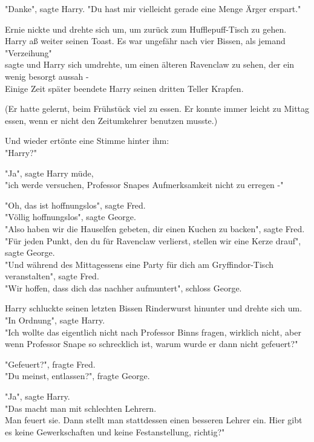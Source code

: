 {"Danke", sagte Harry. "Du hast mir vielleicht gerade eine Menge Ärger erspart."

Ernie nickte und drehte sich um, um zurück zum Hufflepuff-Tisch zu gehen.\\ Harry aß weiter seinen Toast. Es war ungefähr nach vier Bissen, als jemand\\ "Verzeihung"\\ sagte und Harry sich umdrehte, um einen älteren Ravenclaw zu sehen, der ein wenig besorgt aussah -\\ Einige Zeit später beendete Harry seinen dritten Teller Krapfen.

(Er hatte gelernt, beim Frühstück viel zu essen. Er konnte immer leicht zu Mittag essen, wenn er nicht den Zeitumkehrer benutzen musste.)

Und wieder ertönte eine Stimme hinter ihm:\\ "Harry?"

"Ja", sagte Harry müde,\\ "ich werde versuchen, Professor Snapes Aufmerksamkeit nicht zu erregen -"

"Oh, das ist hoffnungslos", sagte Fred.\\ "Völlig hoffnungslos", sagte George.\\ "Also haben wir die Hauselfen gebeten, dir einen Kuchen zu backen", sagte Fred.\\ "Für jeden Punkt, den du für Ravenclaw verlierst, stellen wir eine Kerze drauf", sagte George.\\ "Und während des Mittagessens eine Party für dich am Gryffindor-Tisch veranstalten", sagte Fred.\\ "Wir hoffen, dass dich das nachher aufmuntert", schloss George.

Harry schluckte seinen letzten Bissen Rinderwurst hinunter und drehte sich um.\\ "In Ordnung", sagte Harry.\\ "Ich wollte das eigentlich nicht nach Professor Binns fragen, wirklich nicht, aber wenn Professor Snape so schrecklich ist, warum wurde er dann nicht gefeuert?"

"Gefeuert?", fragte Fred.\\ "Du meinst, entlassen?", fragte George.

"Ja", sagte Harry.\\ "Das macht man mit schlechten Lehrern.\\ Man feuert sie. Dann stellt man stattdessen einen besseren Lehrer ein. Hier gibt es keine Gewerkschaften und keine Festanstellung, richtig?"

}
